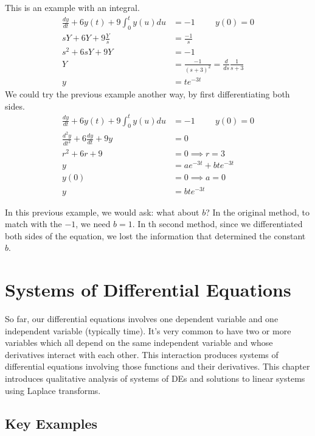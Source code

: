 \documentclass[fleqn,letterpaper]{report}
\begin{document}
\begin{example}
This is an example with an integral.
\begin{align*}
\frac{dy}{dt} + 6y(t) + 9 \int_0^t y(u) du & = -1 \hspace{1cm} y(0)
= 0 \\
sY+ 6Y + 9 \frac{Y}{s} & = \frac{-1}{s} \\
s^2 + 6sY + 9Y & = -1 \\
Y & = \frac{-1}{(s+3)^2} = \frac{d}{ds} \frac{1}{s+3} \\
y & = te^{-3t}
\end{align*}
We could try the previous example another way, by first
differentiating both sides.
\begin{align*}
\frac{dy}{dt} + 6y(t) + 9 \int_0^t y(u) du & = -1 \hspace{1cm} y(0)
= 0 \\
\frac{d^2y}{dt^2} + 6 \frac{dy}{dt} + 9y & = 0 \\
r^2 + 6r + 9 & = 0 \implies r = 3 \\
y & = ae^{-3t} + bte^{-3t} \\
y(0) & = 0 \implies a=0 \\
y & = bte^{-3t}
\end{align*}
\end{example}

In this previous example, we would ask: what about $b$? In the
original method, to match with the $-1$, we need $b=1$.
In th second method, since we differentiated both sides of the
equation, we lost the information that determined the constant
$b$.

\chapter{Systems of Differential Equations}
\label{systems}

So far, our differential equations involves one 
dependent variable and one independent variable (typically
time). It's very common to have two or more variables which
all depend on the same independent variable and whose
derivatives interact with each other. This interaction
produces systems of differential equations involving those
functions and their derivatives. This chapter introduces
qualitative analysis of systems of DEs and solutions to linear
systems using Laplace transforms.

\section{Key Examples}
\label{systems-key-examples}
\end{document}
